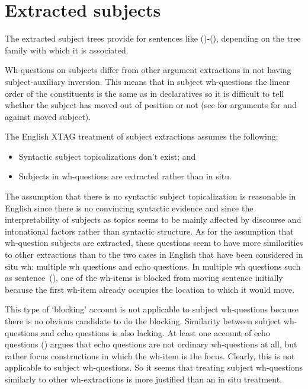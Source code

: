 \section{Extracted subjects}
\label{subject-extraction}

The extracted subject trees provide for sentences like ()-(),
depending on the tree family with which it is associated.


Wh-questions on subjects differ from other argument extractions in
not having subject-auxiliary inversion.  This means that in subject
wh-questions the linear order of the constituents is the same as in
declaratives so it is difficult to tell whether the subject has moved
out of position or not (see \cite{heycock/kroch93gagl} for arguments
for and against moved subject). 

The English XTAG treatment of subject extractions assumes the
following:

\begin{itemize}
\item Syntactic subject topicalizations don't exist; and 
\item Subjects in wh-questions are extracted rather than in situ.
\end{itemize}

The assumption that there is no syntactic subject topicalization is reasonable
in English since there is no convincing syntactic evidence and since the
interpretability of subjects as topics seems to be mainly affected by discourse
and intonational factors rather than syntactic structure. As for the assumption
that wh-question subjects are extracted, these questions seem to have more
similarities to other extractions than to the two cases in English that have
been considered in situ wh: multiple wh questions and echo questions. In
multiple wh questions such as sentence~(), one of the wh-items is blocked
from moving sentence initially because the first wh-item already occupies the
location to which it would move.


This type of `blocking' account is not applicable to
subject wh-questions because there is no obvious candidate to do the
blocking.  Similarity between subject wh-questions and echo questions
is also lacking.  At least one account of echo questions
(\cite{hockey94}) argues that echo questions are not ordinary
wh-questions at all, but rather focus constructions in which the
wh-item is the focus. Clearly, this is not applicable to subject
wh-questions. So it seems that treating subject wh-questions similarly
to other wh-extractions is more justified than an in situ treatment. 

